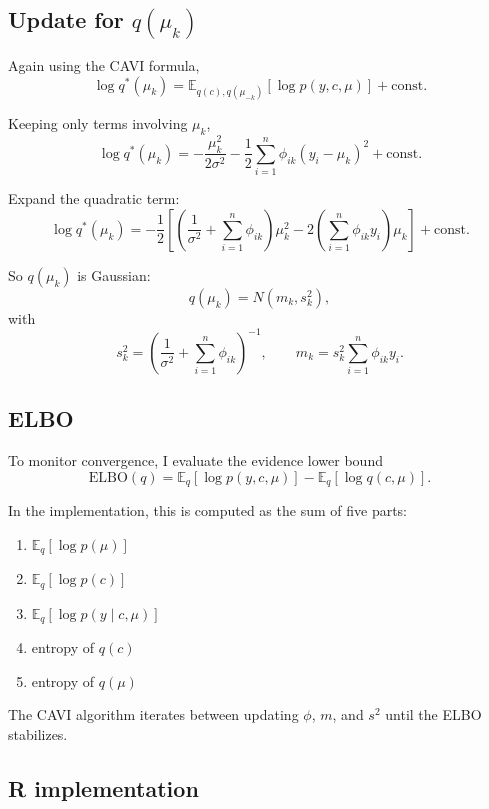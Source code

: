 \documentclass[
]{article}
\providecommand{\tightlist}{%
  \setlength{\itemsep}{0pt}\setlength{\parskip}{0pt}}
\begin{document}
\subsection{\texorpdfstring{Update for
\(q(\mu_k)\)}{Update for q(\textbackslash mu\_k)}}\label{update-for-qmu_k}

Again using the CAVI formula, \[
\log q^*(\mu_k)
=
\mathbb{E}_{q(c), q(\mu_{-k})}[\log p(y, c, \mu)] + \text{const}.
\]

Keeping only terms involving \(\mu_k\), \[
\log q^*(\mu_k)
=
-\frac{\mu_k^2}{2\sigma^2}
-\frac12 \sum_{i=1}^n \phi_{ik}(y_i - \mu_k)^2
+ \text{const}.
\]

Expand the quadratic term: \[
\log q^*(\mu_k)
=
-\frac12
\left[
\left(\frac{1}{\sigma^2} + \sum_{i=1}^n \phi_{ik}\right)\mu_k^2
- 2\left(\sum_{i=1}^n \phi_{ik} y_i\right)\mu_k
\right]
+ \text{const}.
\]

So \(q(\mu_k)\) is Gaussian: \[
q(\mu_k) = N(m_k, s_k^2),
\] with \[
s_k^2
=
\left(\frac{1}{\sigma^2} + \sum_{i=1}^n \phi_{ik}\right)^{-1},
\qquad
m_k
=
s_k^2 \sum_{i=1}^n \phi_{ik} y_i.
\]

\subsection{ELBO}\label{elbo}

To monitor convergence, I evaluate the evidence lower bound \[
\text{ELBO}(q)
=
\mathbb{E}_q[\log p(y, c, \mu)]
-
\mathbb{E}_q[\log q(c, \mu)].
\]

In the implementation, this is computed as the sum of five parts:

\begin{enumerate}
\def\labelenumi{\arabic{enumi}.}
\tightlist
\item
  \(\mathbb{E}_q[\log p(\mu)]\)
\item
  \(\mathbb{E}_q[\log p(c)]\)
\item
  \(\mathbb{E}_q[\log p(y \mid c,\mu)]\)
\item
  entropy of \(q(c)\)
\item
  entropy of \(q(\mu)\)
\end{enumerate}

The CAVI algorithm iterates between updating \(\phi\), \(m\), and
\(s^2\) until the ELBO stabilizes.

\subsection{R implementation}\label{r-implementation}
\end{document}

